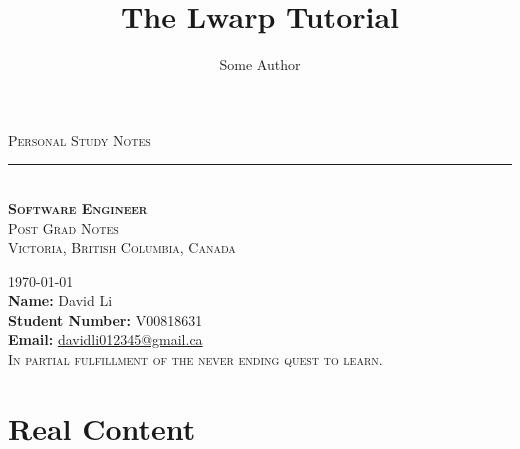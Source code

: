 \documentclass{book}
\title{The Lwarp Tutorial}
\author{Some Author}
\begin{document}
\begin{warpHTML}
	\maketitle                   %
\end{warpHTML}
\begin{center}
	{\Huge \textsc{Personal Study Notes} \\ \vspace{40pt}}
	\rule[13pt]{1\textwidth}{1pt} \\ \vspace{1pt}
	{\LARGE \textbf{{\textsc{Software Engineer}}} \\ }
	{\Large \textsc{Post Grad Notes} \\} 
	\vspace{4pt} 
	\vspace{20pt}
	{\Large \textsc{Victoria, British Columbia, Canada} \\ \vspace{45pt} }
	
	{\Large \textsc{\today} \\ \vspace{15pt}
		\textbf{Name:} \hfill David Li \\
		\textbf{Student Number:} \hfill V00818631 \\
		\textbf{Email:} \hfill \href{mailto:davidli012345@gmail.ca}{davidli012345@gmail.ca} \\
		\vspace{15pt}
		{\Large \textsc{In partial fulfillment of the never ending quest to learn. \\
			}
		}	
	}
\end{center}


\tableofcontents                %
\listoffigures
\lstlistoflistings %



\chapter{Real Content}
\end{document}
